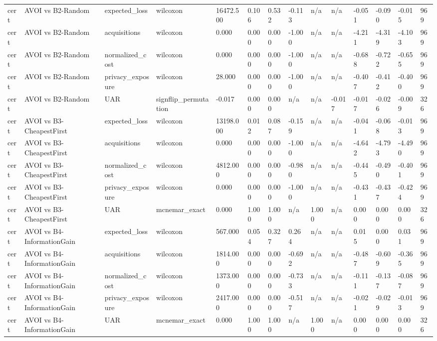 \begin{table}[!ht]
{\begin{tabular}{llllllllllllll}
cert & AVOI vs B2-Random & expected\_loss & wilcoxon & 16472.500 & 0.106 & 0.532 & -0.113 & n/a & n/a & -0.051 & -0.090 & -0.015 & 969 \\
cert & AVOI vs B2-Random & acquisitions & wilcoxon & 0.000 & 0.000 & 0.000 & -1.000 & n/a & n/a & -4.211 & -4.319 & -4.103 & 969 \\
cert & AVOI vs B2-Random & normalized\_cost & wilcoxon & 0.000 & 0.000 & 0.000 & -1.000 & n/a & n/a & -0.688 & -0.722 & -0.655 & 969 \\
cert & AVOI vs B2-Random & privacy\_exposure & wilcoxon & 28.000 & 0.000 & 0.000 & -1.000 & n/a & n/a & -0.407 & -0.412 & -0.400 & 969 \\
cert & AVOI vs B2-Random & UAR & signflip\_permutation & -0.017 & 0.000 & 0.000 & n/a & n/a & -0.017 & -0.017 & -0.026 & -0.009 & 326 \\
cert & AVOI vs B3-CheapestFirst & expected\_loss & wilcoxon & 13198.000 & 0.012 & 0.087 & -0.159 & n/a & n/a & -0.041 & -0.068 & -0.013 & 969 \\
cert & AVOI vs B3-CheapestFirst & acquisitions & wilcoxon & 0.000 & 0.000 & 0.000 & -1.000 & n/a & n/a & -4.642 & -4.793 & -4.490 & 969 \\
cert & AVOI vs B3-CheapestFirst & normalized\_cost & wilcoxon & 4812.000 & 0.000 & 0.000 & -0.980 & n/a & n/a & -0.445 & -0.490 & -0.401 & 969 \\
cert & AVOI vs B3-CheapestFirst & privacy\_exposure & wilcoxon & 0.000 & 0.000 & 0.000 & -1.000 & n/a & n/a & -0.431 & -0.437 & -0.424 & 969 \\
cert & AVOI vs B3-CheapestFirst & UAR & mcnemar\_exact & 0.000 & 1.000 & 1.000 & n/a & 1.000 & n/a & 0.000 & 0.000 & 0.000 & 326 \\
cert & AVOI vs B4-InformationGain & expected\_loss & wilcoxon & 567.000 & 0.054 & 0.327 & 0.264 & n/a & n/a & 0.015 & 0.000 & 0.031 & 969 \\
cert & AVOI vs B4-InformationGain & acquisitions & wilcoxon & 1814.000 & 0.000 & 0.000 & -0.692 & n/a & n/a & -0.487 & -0.609 & -0.365 & 969 \\
cert & AVOI vs B4-InformationGain & normalized\_cost & wilcoxon & 1373.000 & 0.000 & 0.000 & -0.733 & n/a & n/a & -0.111 & -0.137 & -0.087 & 969 \\
cert & AVOI vs B4-InformationGain & privacy\_exposure & wilcoxon & 2417.000 & 0.000 & 0.000 & -0.517 & n/a & n/a & -0.021 & -0.029 & -0.013 & 969 \\
cert & AVOI vs B4-InformationGain & UAR & mcnemar\_exact & 0.000 & 1.000 & 1.000 & n/a & 1.000 & n/a & 0.000 & 0.000 & 0.000 & 326 \\

\end{tabular}}
\end{table}
